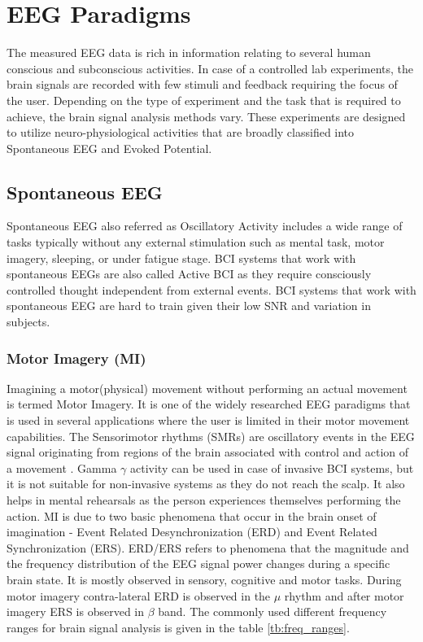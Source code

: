 \section{EEG Paradigms}
The measured EEG data is rich in information relating to several human conscious and subconscious activities. In case of a controlled lab experiments, the brain signals are recorded with few stimuli and feedback requiring the focus of the user. Depending on the type of experiment and the task that is required to achieve, the brain signal analysis methods vary. These experiments are designed to utilize neuro-physiological activities that are broadly classified into Spontaneous EEG and Evoked Potential.

\subsection{Spontaneous EEG}
Spontaneous EEG also referred as Oscillatory Activity includes a wide range of tasks typically without any external stimulation such as mental task, motor imagery, sleeping, or under fatigue stage. BCI systems that work with spontaneous EEGs are also called Active BCI as they require consciously controlled thought independent from external events. BCI systems that work with spontaneous EEG are hard to train given their low SNR and variation in subjects.

\subsubsection{Motor Imagery (MI)}
Imagining a motor(physical) movement without performing an actual movement is termed Motor Imagery. It is one of the widely researched EEG paradigms that is used in several applications where the user is limited in their motor movement capabilities. The Sensorimotor rhythms (SMRs) are oscillatory events in the EEG signal originating from regions of the brain associated with control and action of a movement \cite{2019_BMI_MIEEG}. Gamma $\gamma$ activity can be used in case of invasive BCI systems, but it is not suitable for non-invasive systems as they do not reach the scalp. It also helps in mental rehearsals as the person experiences themselves performing the action. MI is due to two basic phenomena that occur in the brain onset of imagination - Event Related Desynchronization (ERD) and Event Related Synchronization (ERS). ERD/ERS refers to phenomena that the magnitude and the frequency distribution of the EEG signal power changes during a specific brain state. It is mostly observed in sensory, cognitive and motor tasks. During motor imagery contra-lateral ERD is observed in the $\mu$ rhythm and after motor imagery ERS is observed in $\beta$ band. The commonly used different frequency ranges for brain signal analysis is given in the table \ref{tb:freq_ranges}.


